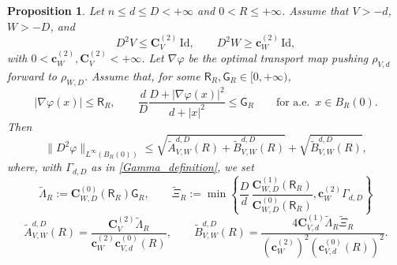 \documentclass[11pt,a4paper,reqno]{amsart}
\numberwithin{equation}{section}
\newtheorem{proposition}[theorem]{Proposition}
\theoremstyle{definition}
\newcommand{\<}{\ensuremath \leq}
\renewcommand{\>}{\ensuremath \geq}
\newcommand{\CV}{\mathbf{C}_V}
\newcommand{\cW}{\mathbf{c}_W}
\newcommand{\CVp}[1]{\mathbf{C}_{V,#1}}
\newcommand{\CWp}[1]{\mathbf{C}_{W,#1}}
\newcommand{\cVp}[1]{\mathbf{c}_{V,#1}}
\begin{document}
\begin{proposition}\label{Conditional_finite_D}
Let $n\le d\le D<+\infty$ and $0<R\le+\infty$. Assume that $V>-d$, $W>-D$, and
\[
    D^2V\le \CV^{(2)}\,\mathrm{Id}, \qquad
    D^2W\ge \cW^{(2)}\,\mathrm{Id},
\]
with $0<\cW^{(2)},\CV^{(2)}<+\infty$. Let $\nabla\varphi$ be the optimal transport map pushing $\rho_{V,d}$ forward to $\rho_{W,D}$. Assume that, for some $\mathsf R_R,\mathsf G_R\in[0,+\infty)$,
\begin{equation}\label{Growth_assumption_general}
    |\nabla\varphi(x)|\le \mathsf R_R,
    \qquad
    \frac{d}{D}\frac{D+|\nabla\varphi(x)|^2}{d+|x|^2}\le \mathsf G_R
    \qquad \text{for a.e. }\, x\in B_R(0).
\end{equation}
Then
\begin{equation}\label{Finite_D_local_bound}
    \|D^2\varphi\|_{L^\infty(B_R(0))}
    \le
    \sqrt{\widetilde A_{V,W}^{d,D}(R)+\widetilde B_{V,W}^{d,D}(R)}+\sqrt{\widetilde B_{V,W}^{d,D}(R)},
\end{equation}
where, with $\Gamma_{d,D}$ as in \cref{Gamma_definition}, we set
\[
\widetilde\Lambda_R
:=
\CWp{D}^{(0)}(\mathsf R_R)\mathsf G_R,\qquad
\widetilde\Xi_R
:=
\min\left\{
\frac{D}{d}\,
\frac{\CWp{D}^{(1)}(\mathsf R_R)}
{\CWp{D}^{(0)}(\mathsf R_R)},
\cW^{(2)}\Gamma_{d,D}
\right\}
\]
\[
\widetilde A_{V,W}^{d,D}(R)
=
    \frac{\CV^{(2)}\widetilde\Lambda_R}{\cW^{(2)}\cVp{d}^{(0)}(R)},\qquad
\widetilde B_{V,W}^{d,D}(R)
=
    \frac{4\CVp{d}^{(1)}\widetilde\Lambda_R\widetilde\Xi_R}
    {(\cW^{(2)})^2(\cVp{d}^{(0)}(R))^2}.
\]
\end{proposition}
\end{document}
